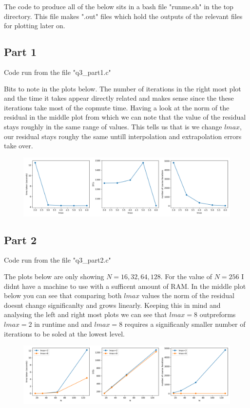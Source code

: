\documentclass[a4paper]{article}
\begin{document}
	The code to produce all of the below sits in a bash file "runme.sh" in the top 
	directory. This file makes ".out" files which hold the outputs of the relevant
	files for plotting later on. 

\subsection*{Part 1}
	
	Code run from the file "q3\_part1.c"
	
	Bits to note in the plots below. The number of iterations in the right most plot
	and the time it takes appear directly related and makes sense since the these
	iterations take most of the copmute time. Having a look at the norm of the 
	residual in the middle plot from which we can note that the value of the residual 
	stays roughly in the same range of values. This tells us that is we change $lmax$,
	our residual stays roughy the same untill interpolation and extrapolation errors 
	take over.

	\begin{figure}[h!]
	    \centering
    	\includegraphics[width=1\linewidth]{./q3_part1.png}
	\end{figure}

\vspace{2cm}


\subsection*{Part 2}
		
	Code run from the file "q3\_part2.c"

	The plots below are only showing $N = 16, 32, 64, 128$. For the value of $N=256$
	I didnt have a machine to use with a sufficent amount of RAM. In the middle plot 
	below you can see that comparing both $lmax$ values the norm of the residual doesnt
	change significanlty and grows linearly. Keeping this in mind and analysing the 
	left and right most plots we can see that $lmax=8$ outpreforms $lmax=2$ in runtime and
	and $lmax=8$ requires a significanly smaller number of iterations to be soled at the
	lowest level.  

		
	\begin{figure}[h!]
	    \centering
    	\includegraphics[width=1\linewidth]{./q3_part2.png}
	\end{figure}
	

 
 
\end{document}

